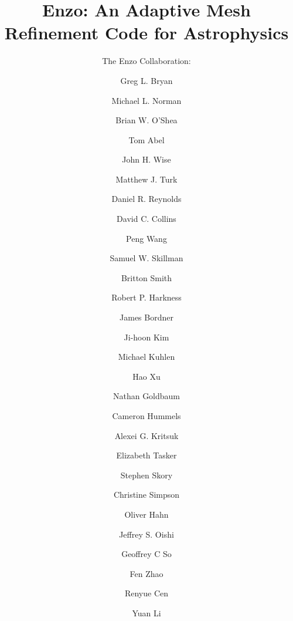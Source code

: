 \documentclass[onecolumn,iop]{emulateapj}  %
\begin{document}
\title{Enzo: An Adaptive Mesh Refinement Code for Astrophysics}
\author{The Enzo Collaboration:}
\author{Greg L. Bryan}
\author{Michael L. Norman}
\author{Brian W. O'Shea}
\author{Tom Abel}
\author{John H. Wise}
\author{Matthew J. Turk}
\author{Daniel R. Reynolds}
\author{David C. Collins}
\author{Peng Wang}
\author{Samuel W. Skillman}
\author{Britton Smith}
\author{Robert P. Harkness}
\author{James Bordner}
\author{Ji-hoon Kim}
\author{Michael Kuhlen}
\author{Hao Xu}
\author{Nathan Goldbaum}
\author{Cameron Hummels}
\author{Alexei G. Kritsuk}
\author{Elizabeth Tasker}
\author{Stephen Skory}
\author{Christine Simpson}
\author{Oliver Hahn}
\author{Jeffrey S. Oishi}
\author{Geoffrey C So}
\author{Fen Zhao}
\author{Renyue Cen}
\author{Yuan Li}
\end{document}
